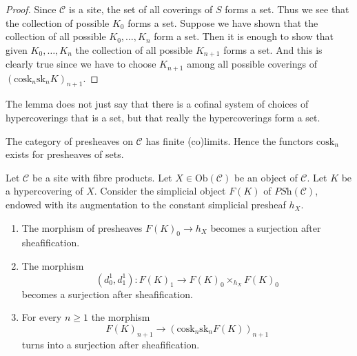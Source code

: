 \begin{proof}
Since $\mathcal{C}$ is a site, the set of all coverings of
$S$ forms a set. Thus we see that the collection
of possible $K_0$ forms a set. Suppose we have shown that
the collection of all possible $K_0, \ldots, K_n$ form
a set. Then it is enough to show that given
$K_0, \ldots, K_n$ the collection of all possible
$K_{n + 1}$ forms a set. And this is clearly true since
we have to choose $K_{n + 1}$ among all possible coverings
of $(\text{cosk}_n \text{sk}_n K)_{n + 1}$.
\end{proof}

\begin{remark}
\label{remark-hypercoverings-really-set}
The lemma does not just say that there is a cofinal
system of choices of hypercoverings that is a set,
but that really the hypercoverings form a set.
\end{remark}

\noindent
The category of presheaves on $\mathcal{C}$ has
finite (co)limits. Hence the functors $\text{cosk}_n$
exists for presheaves of sets.

\begin{lemma}
\label{lemma-hypercovering-F}
Let $\mathcal{C}$ be a site with fibre products.
Let $X \in \text{Ob}(\mathcal{C})$ be an object of $\mathcal{C}$.
Let $K$ be a hypercovering of $X$.
Consider the simplicial object $F(K)$ of $\textit{PSh}(\mathcal{C})$,
endowed with its augmentation to the constant simplicial presheaf $h_X$.
\begin{enumerate}
\item The morphism of presheaves $F(K)_0 \to h_X$ becomes
a surjection after sheafification.
\item The morphism
$$
(d^1_0, d^1_1) :
F(K)_1
\longrightarrow
F(K)_0 \times_{h_X} F(K)_0
$$
becomes a surjection after sheafification.
\item For every $n \geq 1$ the morphism
$$
F(K)_{n + 1} \longrightarrow (\text{cosk}_n \text{sk}_n F(K))_{n + 1}
$$
turns into a surjection after sheafification.
\end{enumerate}
\end{lemma}

